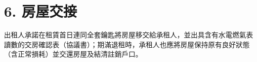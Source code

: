 \section*{6. 房屋交接}
出租人承諾在租賃首日連同全套鑰匙將房屋移交給承租人，並出具含有水電燃氣表讀數的交房確認表（協議書）；期滿退租時，承租人也應將房屋保持原有良好狀態（含正常損耗）並交還房屋及結清註銷戶口。
